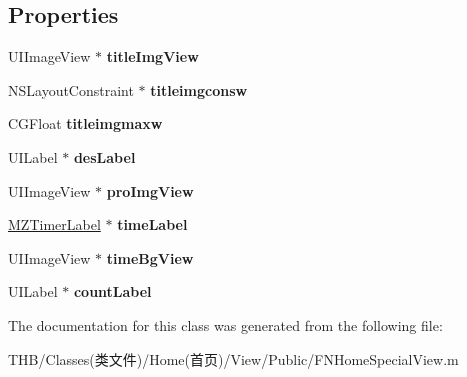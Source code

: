 \subsection*{Properties}
\begin{DoxyCompactItemize}
\item 
\mbox{\label{interface_f_n_home_special_sub_view_a2dfcbef53da1c573c81cc8d0c570250c}} 
U\+I\+Image\+View $\ast$ {\bfseries title\+Img\+View}
\item 
\mbox{\label{interface_f_n_home_special_sub_view_a776181720a897e75d03bbd6fd5ee164a}} 
N\+S\+Layout\+Constraint $\ast$ {\bfseries titleimgconsw}
\item 
\mbox{\label{interface_f_n_home_special_sub_view_adc25e9d2f66a12a4768d90f316530934}} 
C\+G\+Float {\bfseries titleimgmaxw}
\item 
\mbox{\label{interface_f_n_home_special_sub_view_a2340ada576b62488f30a0052716cc8d1}} 
U\+I\+Label $\ast$ {\bfseries des\+Label}
\item 
\mbox{\label{interface_f_n_home_special_sub_view_a6529d90d986955a0bb64eda38704f0f2}} 
U\+I\+Image\+View $\ast$ {\bfseries pro\+Img\+View}
\item 
\mbox{\label{interface_f_n_home_special_sub_view_ad6b024721e669fd3f7657ad3bc35708c}} 
\mbox{\hyperlink{interface_m_z_timer_label}{M\+Z\+Timer\+Label}} $\ast$ {\bfseries time\+Label}
\item 
\mbox{\label{interface_f_n_home_special_sub_view_a0357b5765449b6796c086f0cde4748d2}} 
U\+I\+Image\+View $\ast$ {\bfseries time\+Bg\+View}
\item 
\mbox{\label{interface_f_n_home_special_sub_view_aeeb5e45d3e9c79630dde91f2c23695b5}} 
U\+I\+Label $\ast$ {\bfseries count\+Label}
\end{DoxyCompactItemize}


The documentation for this class was generated from the following file\+:\begin{DoxyCompactItemize}
\item 
T\+H\+B/\+Classes(类文件)/\+Home(首页)/\+View/\+Public/F\+N\+Home\+Special\+View.\+m\end{DoxyCompactItemize}
